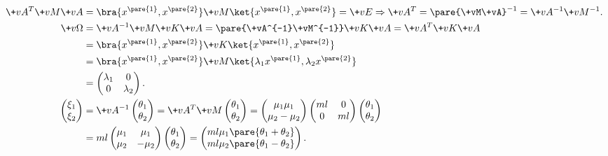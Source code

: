 \documentclass[../LectureNotes.tex]{subfiles}
\begin{document}
\begin{align*}
    \+vA^T \+vM \+vA &= \bra{x^{\pare{1}}, x^{\pare{2}}} \+vM \ket{x^{\pare{1}},x^{\pare{2}}} = \+vE\Rightarrow \+vA^T = \pare{\+vM\+vA}^{-1} = \+vA^{-1}\+vM^{-1}. \\
    \+v\Omega &= \+vA^{-1}\+vM\+vK\+vA = \pare{\+vA^{-1}\+vM^{-1}}\+vK\+vA = \+vA^T \+vK\+vA \\
    &= \bra{x^{\pare{1}}, x^{\pare{2}}} \+vK \ket{x^{\pare{1}},x^{\pare{2}}} \\
    &= \bra{x^{\pare{1}}, x^{\pare{2}}} \+vM \ket{\lambda_1 x^{\pare{1}},\lambda_2 x^{\pare{2}}} \\
    &= \begin{pmatrix}
        \lambda_1 & 0 \\
        0 & \lambda_2
    \end{pmatrix}. \\
    \begin{pmatrix}
        \xi_1 \\ \xi_2
    \end{pmatrix} &= \+vA^{-1}\begin{pmatrix}
        \theta_1 \\ \theta_2
    \end{pmatrix} = \+vA^T \+vM \begin{pmatrix}
        \theta_1 \\ \theta_2
    \end{pmatrix} = \begin{pmatrix}
        \mu_1 \mu_1 \\ \mu_2 -\mu_2
    \end{pmatrix}\begin{pmatrix}
        ml & 0 \\
        0 & ml
    \end{pmatrix}\begin{pmatrix}
        \theta_1 \\ \theta_2
    \end{pmatrix} \\ &= ml \begin{pmatrix}
        \mu_1 & \mu_1 \\
        \mu_2 & -\mu_2
    \end{pmatrix}\begin{pmatrix}
        \theta_1 \\ \theta_2
    \end{pmatrix} = \begin{pmatrix}
        ml\mu_1\pare{\theta_1 + \theta_2} \\
        ml\mu_2\pare{\theta_1 - \theta_2}
    \end{pmatrix}.
\end{align*}
\end{document}
